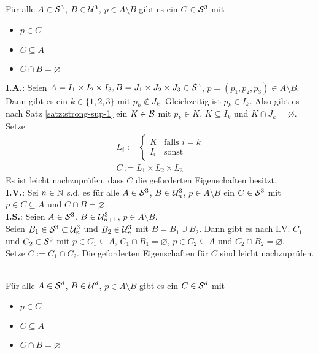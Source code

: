 \begin{satz}
    Für alle $A \in \mathcal{S}^3$, $B \in \mathcal{U}^3$, $p \in A \setminus B$ gibt es ein $C \in \mathcal{S}^3$ mit
    \begin{itemize}
        \item $p \in C$
        \item $C \subseteq A$
        \item $C \cap B = \varnothing$
    \end{itemize}
\end{satz}

\begin{bew}
    \textbf{I.A.}: Seien $A = I_1 \times I_2 \times I_3, B = J_1 \times J_2 \times J_3 \in \mathcal{S}^3$, $p = (p_1,p_2,p_3) \in A \setminus B$.\\
    Dann gibt es ein $k \in \{1,2,3\}$ mit $p_k \notin J_k$. 
    Gleichzeitig ist $p_k \in I_k$. 
    Also gibt es nach Satz \ref{satz:strong-sup-1} ein $K \in \mathcal{B}$ mit $p_k \in K$, $K \subseteq I_k$ und $K \cap J_k = \varnothing$.
    Setze
    \begin{align*}
        L_i :=
        \begin{cases}
            K & \text{falls $i=k$}\\
            I_i & \text{sonst}
        \end{cases}\\
        C := L_1 \times L_2 \times L_3
    \end{align*}
    Es ist leicht nachzuprüfen, dass $C$ die geforderten Eigenschaften besitzt.\\
    \textbf{I.V.}: Sei $n \in \mathbb{N}$ s.d. es für alle $A \in \mathcal{S}^3$, $B \in \mathcal{U}_n^3$, $p \in A \setminus B$ ein $C \in \mathcal{S}^3$ mit $p \in C \subseteq A$ und $C \cap B = \varnothing$.\\
    \textbf{I.S.}: Seien $A \in \mathcal{S}^3$, $B \in \mathcal{U}_{n+1}^3$, $p \in A \setminus B$.\\
    Seien $B_1 \in \mathcal{S}^3 \subset \mathcal{U}_n^3$ und $B_2 \in \mathcal{U}_n^3$ mit $B = B_1 \cup B_2$.
    Dann gibt es nach I.V. $C_1$ und $C_2 \in \mathcal{S}^3$ mit $p \in C_1 \subseteq A$, $C_1 \cap B_1 = \varnothing$, $p \in C_2 \subseteq A$ und $C_2 \cap B_2 = \varnothing$.\\
    Setze $C := C_1 \cap C_2$. Die geforderten Eigenschaften für $C$ sind leicht nachzuprüfen.
\end{bew}


\begin{satz}\ \\
    Für alle $A \in \mathcal{S}^d$, $B \in \mathcal{U}^d$, $p \in A \setminus B$ gibt es ein $C \in \mathcal{S}^d$ mit
    \begin{itemize}
        \item $p \in C$
        \item $C \subseteq A$
        \item $C \cap B = \varnothing$
    \end{itemize}
\end{satz}

